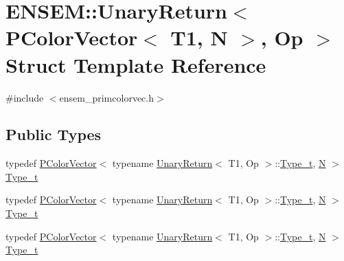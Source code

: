\hypertarget{structENSEM_1_1UnaryReturn_3_01PColorVector_3_01T1_00_01N_01_4_00_01Op_01_4}{}\section{E\+N\+S\+EM\+:\+:Unary\+Return$<$ P\+Color\+Vector$<$ T1, N $>$, Op $>$ Struct Template Reference}
\label{structENSEM_1_1UnaryReturn_3_01PColorVector_3_01T1_00_01N_01_4_00_01Op_01_4}


{\ttfamily \#include $<$ensem\+\_\+primcolorvec.\+h$>$}

\subsection*{Public Types}
\begin{DoxyCompactItemize}
\item 
typedef \mbox{\hyperlink{classENSEM_1_1PColorVector}{P\+Color\+Vector}}$<$ typename \mbox{\hyperlink{structENSEM_1_1UnaryReturn}{Unary\+Return}}$<$ T1, Op $>$\+::\mbox{\hyperlink{structENSEM_1_1UnaryReturn_3_01PColorVector_3_01T1_00_01N_01_4_00_01Op_01_4_a6f37cb5e1ae5f22c02017b613c6b7e24}{Type\+\_\+t}}, \mbox{\hyperlink{adat__devel_2lib_2hadron_2operator__name__util_8cc_a7722c8ecbb62d99aee7ce68b1752f337}{N}} $>$ \mbox{\hyperlink{structENSEM_1_1UnaryReturn_3_01PColorVector_3_01T1_00_01N_01_4_00_01Op_01_4_a6f37cb5e1ae5f22c02017b613c6b7e24}{Type\+\_\+t}}
\item 
typedef \mbox{\hyperlink{classENSEM_1_1PColorVector}{P\+Color\+Vector}}$<$ typename \mbox{\hyperlink{structENSEM_1_1UnaryReturn}{Unary\+Return}}$<$ T1, Op $>$\+::\mbox{\hyperlink{structENSEM_1_1UnaryReturn_3_01PColorVector_3_01T1_00_01N_01_4_00_01Op_01_4_a6f37cb5e1ae5f22c02017b613c6b7e24}{Type\+\_\+t}}, \mbox{\hyperlink{adat__devel_2lib_2hadron_2operator__name__util_8cc_a7722c8ecbb62d99aee7ce68b1752f337}{N}} $>$ \mbox{\hyperlink{structENSEM_1_1UnaryReturn_3_01PColorVector_3_01T1_00_01N_01_4_00_01Op_01_4_a6f37cb5e1ae5f22c02017b613c6b7e24}{Type\+\_\+t}}
\item 
typedef \mbox{\hyperlink{classENSEM_1_1PColorVector}{P\+Color\+Vector}}$<$ typename \mbox{\hyperlink{structENSEM_1_1UnaryReturn}{Unary\+Return}}$<$ T1, Op $>$\+::\mbox{\hyperlink{structENSEM_1_1UnaryReturn_3_01PColorVector_3_01T1_00_01N_01_4_00_01Op_01_4_a6f37cb5e1ae5f22c02017b613c6b7e24}{Type\+\_\+t}}, \mbox{\hyperlink{adat__devel_2lib_2hadron_2operator__name__util_8cc_a7722c8ecbb62d99aee7ce68b1752f337}{N}} $>$ \mbox{\hyperlink{structENSEM_1_1UnaryReturn_3_01PColorVector_3_01T1_00_01N_01_4_00_01Op_01_4_a6f37cb5e1ae5f22c02017b613c6b7e24}{Type\+\_\+t}}
\end{DoxyCompactItemize}


